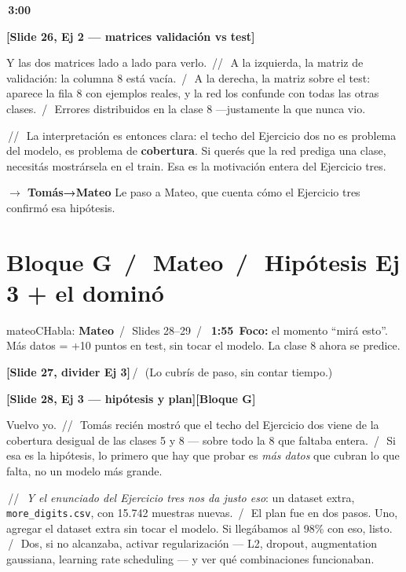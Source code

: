 \documentclass[11pt,a4paper]{article}
\newcommand{\code}[1]{\texttt{\textcolor{accent}{#1}}}
\newcommand{\slidenum}[1]{\textcolor{accent}{\textbf{[Slide #1]}}}
\newcommand{\timing}[1]{\textcolor{muted}{\textbf{\,#1\,}}}
\newcommand{\bloque}[1]{\textcolor{muted}{\small\textbf{[Bloque #1]}}}
\newcommand{\enunciado}[1]{\textcolor{warn}{\textit{#1}}}
\newcommand{\pausa}{\textcolor{muted}{\,/\,}}
\newcommand{\Pausa}{\textcolor{muted}{\,/\!/\,}}
\newcommand{\paso}[1]{\textcolor{accent}{\textbf{$\to$ #1}}}
\begin{document}
\timing{3:00}

\slidenum{26, Ej 2 — matrices validación vs test}

Y las dos matrices lado a lado para verlo. \Pausa\ A la izquierda, la matriz de validación: la columna 8 está vacía. \pausa\ A la derecha, la matriz sobre el test: aparece la fila 8 con ejemplos reales, y la red los confunde con todas las otras clases. \pausa\ Errores distribuidos en la clase 8 ---justamente la que nunca vio.

\Pausa\ La interpretación es entonces clara: el techo del Ejercicio dos no es problema del modelo, es problema de \textbf{cobertura}. Si querés que la red prediga una clase, necesitás mostrársela en el train. Esa es la motivación entera del Ejercicio tres.

\paso{Tomás→Mateo} \quad Le paso a Mateo, que cuenta cómo el Ejercicio tres confirmó esa hipótesis.

\section{Bloque G \pausa\ \textcolor{mateoC}{Mateo} \pausa\ Hipótesis Ej 3 + el dominó}\label{sec:bloqueG}

\begin{personabox}{mateoC}{Habla: \textcolor{mateoC}{\textbf{Mateo}} \pausa\ Slides 28--29 \pausa\ \timing{1:55}}
\textbf{Foco:} el momento ``mirá esto''. Más datos = +10 puntos en test, sin tocar el modelo. La clase 8 ahora se predice.
\end{personabox}

\slidenum{27, divider Ej 3}\quad \pausa\ (Lo cubrís de paso, sin contar tiempo.)

\medskip
\slidenum{28, Ej 3 — hipótesis y plan}\quad \bloque{G}

Vuelvo yo. \Pausa\ Tomás recién mostró que el techo del Ejercicio dos viene de la cobertura desigual de las clases 5 y 8 --- sobre todo la 8 que faltaba entera. \pausa\ Si esa es la hipótesis, lo primero que hay que probar es \emph{más datos} que cubran lo que falta, no un modelo más grande.

\Pausa\ \enunciado{Y el enunciado del Ejercicio tres nos da justo eso}: un dataset extra, \code{more\_digits.csv}, con 15.742 muestras nuevas. \pausa\ El plan fue en dos pasos. Uno, agregar el dataset extra sin tocar el modelo. Si llegábamos al 98\% con eso, listo. \pausa\ Dos, si no alcanzaba, activar regularización --- L2, dropout, augmentation gaussiana, learning rate scheduling --- y ver qué combinaciones funcionaban.
\end{document}
